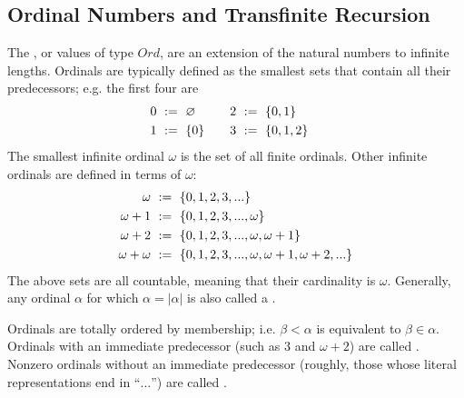 \documentclass[preprint]{sigplanconf}
\begin{document}
\subsection{Ordinal Numbers and Transfinite Recursion}

The , or values of type $Ord$, are an extension of the natural numbers to infinite lengths.
Ordinals are typically defined as the smallest sets that contain all their predecessors; e.g. the first four are
\begin{equation}
\begin{aligned}
	\begin{aligned}
		0 &\ := \ \varnothing \\
		1 &\ := \ \{{0}\}
	\end{aligned}
	&\ \ \ \ \ \ 
	\begin{aligned}
		2 &\ := \ \{{0,1}\} \\
		3 &\ := \ \{{0,1,2}\}
	\end{aligned}
\end{aligned}
\end{equation}
The smallest infinite ordinal $\omega$ is the set of all finite ordinals.
Other infinite ordinals are defined in terms of $\omega$:
\begin{equation}
\begin{aligned}
	\omega &\ := \ \set{0,1,2,3,...} \\
	\omega+1 &\ := \ \set{0,1,2,3,...,\omega} \\
	\omega+2 &\ := \ \set{0,1,2,3,...,\omega,\omega+1} \\
	\omega+\omega &\ := \ \set{0,1,2,3,...,\omega,\omega+1,\omega+2,...}
\end{aligned}
\end{equation}
The above sets are all countable, meaning that their cardinality is $\omega$.
Generally, any ordinal $\alpha$ for which $\alpha = |\alpha|$ is also called a .%

Ordinals are totally ordered by membership; i.e. $\beta < \alpha$ is equivalent to $\beta \in \alpha$.
Ordinals with an immediate predecessor (such as $3$ and $\omega+2$) are called .
Nonzero ordinals without an immediate predecessor (roughly, those whose literal representations end in ``$...$'') are called .
\end{document}
